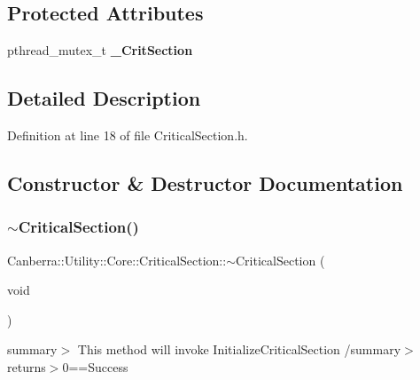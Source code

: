 \subsection*{Protected Attributes}
\begin{DoxyCompactItemize}
\item 
\mbox{\label{class_canberra_1_1_utility_1_1_core_1_1_critical_section_a5d8b3da81e150c0012ac041610244ba5}} 
pthread\+\_\+mutex\+\_\+t {\bfseries \+\_\+\+Crit\+Section}
\end{DoxyCompactItemize}


\subsection{Detailed Description}


Definition at line 18 of file Critical\+Section.\+h.



\subsection{Constructor \& Destructor Documentation}
\mbox{\label{class_canberra_1_1_utility_1_1_core_1_1_critical_section_a8b509ef63ce6c5d50539d2c7e1efef46_a8b509ef63ce6c5d50539d2c7e1efef46}} 
\subsubsection{\texorpdfstring{$\sim$\+Critical\+Section()}{~CriticalSection()}}
{\footnotesize\ttfamily Canberra\+::\+Utility\+::\+Core\+::\+Critical\+Section\+::$\sim$\+Critical\+Section (\begin{DoxyParamCaption}\item[{void}]{ }\end{DoxyParamCaption})\hspace{0.3cm}{\ttfamily [virtual]}}

summary$>$ This method will invoke Initialize\+Critical\+Section /summary$>$ returns$>$0==Success

